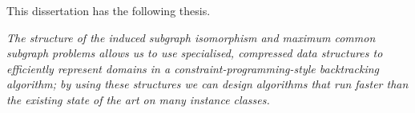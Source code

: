 This dissertation has the following thesis.

\emph{The structure of the induced subgraph isomorphism and maximum common
subgraph problems allows us to use specialised, compressed data structures to
efficiently represent domains in a constraint-programming-style
backtracking algorithm; by using these
structures we can design algorithms that run faster than the existing state of
the art on many instance classes.}
